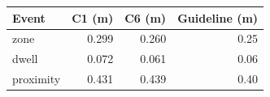 \begin{tabular}{lrrr}
\toprule
Event & C1 (m) & C6 (m) & Guideline (m) \\
\midrule
zone & 0.299 & 0.260 & 0.25 \\
dwell & 0.072 & 0.061 & 0.06 \\
proximity & 0.431 & 0.439 & 0.40 \\
\bottomrule
\end{tabular}
